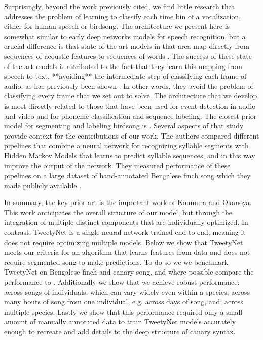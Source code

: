 \documentclass[10pt,letterpaper]{article}
\begin{document}
Surprisingly, beyond the work previously cited, we find little research that addresses the problem of learning to classify each time bin of a vocalization, either for human speech or birdsong.
The architecture we present here is somewhat similar to early deep networks models for speech recognition, 
but a crucial difference is that state-of-the-art models in that area 
map directly from sequences of acoustic features to sequences of words \cite{graves2006connectionist}.
The success of these state-of-the-art models is attributed to the fact that they learn this mapping from speech to text, **avoiding** the intermediate step of classifying each frame of audio, as has previously been shown \cite{graves_supervised_2012}.
In other words, they avoid the problem of classifying every frame that we set out to solve.
The architecture that we develop is most directly related to those that have been used for event 
detection in audio and video \cite{bock_polyphonic_2012-1,parascandolo_recurrent_2016} 
and for phoneme classification and sequence labeling\cite{graves_framewise_2005,graves_supervised_2012}.
The closest prior model for segmenting and labeling birdsong is \cite{koumura_automatic_2016-1}. 
Several aspects of that study provide context for the contributions of our work. 
The authors compared different pipelines that combine a neural network for recognizing syllable 
segments with Hidden Markov Models that learns to predict syllable sequences, and in this way 
improve the output of the network. They measured performance of these pipelines on a large dataset of 
hand-annotated Bengalese finch song which they made publicly available \cite{koumura_birdsongrecognition_2016}.

In summary, the key prior art is the important work of Koumura and Okanoya\cite{koumura_automatic_2016-1}. This work anticipates the overall structure of our model, but through the integration of multiple distinct components that are individually optimized.  In contrast, TweetyNet is a single neural network trained end-to-end, meaning it does not require optimizing multiple models. 
Below we show that TweetyNet meets our criteria for an algorithm that 
learns features from data and does not require segmented song to make predictions.
To do so we we benchmark TweetyNet on Bengalese finch and canary song, 
and where possible compare the performance to \cite{koumura_automatic_2016-1}. 
Additionally we show that we achieve robust performance:
across songs of individuals, which can vary widely even within a species; 
across many bouts of song from one individual, e.g. across days of song, and; 
across multiple species.
Lastly we show that this performance required only a small amount of 
manually annotated data to train TweetyNet models accurately enough to recreate and add details to the deep structure of canary syntax.
\end{document}
